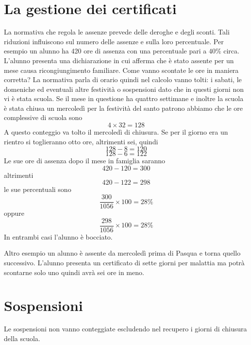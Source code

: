 \documentclass{article}
\begin{document}
\section*{La gestione dei certificati}
La normativa che regola le assenze prevede delle deroghe e degli sconti. Tali riduzioni influiscono sul numero delle assenze e sulla loro percentuale. 
Per esempio un alunno ha 420 ore di assenza con una percentuale pari a $40\%$ circa. L'alunno presenta una dichiarazione in cui afferma che è stato assente per un mese causa ricongiungimento familiare. Come vanno scontate le ore in maniera corretta? 
La normativa parla di orario quindi nel calcolo vanno tolti: i sabati, le domeniche ed eventuali altre festività o sospensioni dato che in questi giorni non vi è stata scuola. Se il mese in questione ha quattro settimane e inoltre la scuola è stata chiusa un mercoledì per la festività del santo patrono abbiamo che le ore complessive di scuola sono \[4\times 32=128\]
A questo conteggio va tolto il mercoledì di chiusura. Se per il giorno era un rientro si toglieranno otto ore, altrimenti sei, quindi 
\[128-8=120\]
\[128-6=122\]
Le sue ore di assenza dopo il mese in famiglia saranno
\[420-120=300\]
altrimenti
\[420-122=298\]
le sue percentuali
sono \[\dfrac{300}{1056}\times 100=28\%\]  oppure \[\dfrac{298}{1056}\times 100=28\%\] In entrambi casi l'alunno è bocciato.

Altro esempio un alunno è assente da mercoledì prima di Pasqua e torna quello successivo. L'alunno presenta un certificato di sette giorni per malattia ma potrà scontarne solo uno quindi avrà sei ore in meno.
\section*{Sospensioni}
Le sospensioni non vanno conteggiate escludendo nel recupero i giorni di chiusura della scuola. 
\nocite{*}
\printbibliography
\end{document}

